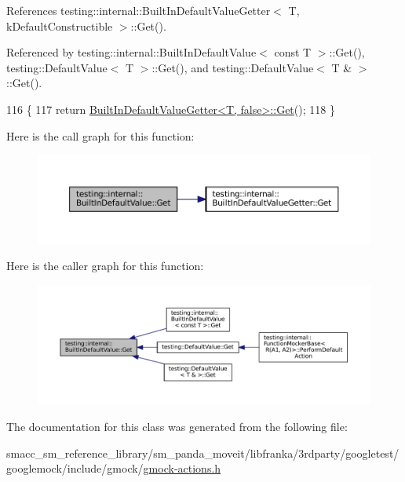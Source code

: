 References testing\+::internal\+::\+Built\+In\+Default\+Value\+Getter$<$ T, k\+Default\+Constructible $>$\+::\+Get().



Referenced by testing\+::internal\+::\+Built\+In\+Default\+Value$<$ const T $>$\+::\+Get(), testing\+::\+Default\+Value$<$ T $>$\+::\+Get(), and testing\+::\+Default\+Value$<$ T \& $>$\+::\+Get().


\begin{DoxyCode}
116                  \{
117     \textcolor{keywordflow}{return} \hyperlink{structtesting_1_1internal_1_1BuiltInDefaultValueGetter_a61c47c50cdb6ab488dabe2cec3b97fc8}{BuiltInDefaultValueGetter<T, false>::Get}();
118   \}
\end{DoxyCode}
Here is the call graph for this function\+:
\nopagebreak
\begin{figure}[H]
\begin{center}
\leavevmode
\includegraphics[width=350pt]{classtesting_1_1internal_1_1BuiltInDefaultValue_a7e26c1df14a887c8f393b29d6ea162e6_cgraph}
\end{center}
\end{figure}
Here is the caller graph for this function\+:
\nopagebreak
\begin{figure}[H]
\begin{center}
\leavevmode
\includegraphics[width=350pt]{classtesting_1_1internal_1_1BuiltInDefaultValue_a7e26c1df14a887c8f393b29d6ea162e6_icgraph}
\end{center}
\end{figure}


The documentation for this class was generated from the following file\+:\begin{DoxyCompactItemize}
\item 
smacc\+\_\+sm\+\_\+reference\+\_\+library/sm\+\_\+panda\+\_\+moveit/libfranka/3rdparty/googletest/googlemock/include/gmock/\hyperlink{gmock-actions_8h}{gmock-\/actions.\+h}\end{DoxyCompactItemize}
